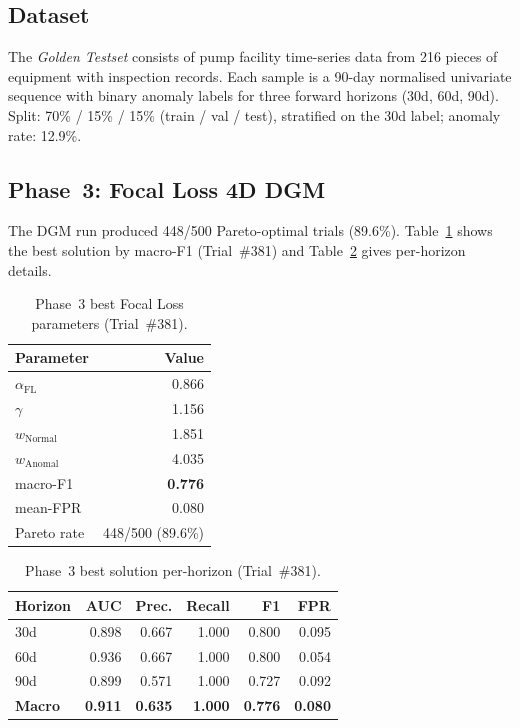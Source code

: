 ﻿\documentclass[twocolumn]{article}
\begin{document}
\subsection{Dataset}

The \emph{Golden Testset} consists of pump facility time-series
data from 216 pieces of equipment with inspection records.
Each sample is a 90-day normalised univariate sequence with
binary anomaly labels for three forward horizons (30d, 60d, 90d).
Split: 70\% / 15\% / 15\% (train / val / test),
stratified on the 30d label; anomaly rate: 12.9\%.

\subsection{Phase~3: Focal Loss 4D DGM}

The DGM run produced 448/500 Pareto-optimal trials (89.6\%).
Table~\ref{tab:v02_best} shows the best solution by macro-F1
(Trial~\#381) and Table~\ref{tab:v02_per_horizon} gives
per-horizon details.

\begin{table}
\centering
\caption{Phase~3 best Focal Loss parameters (Trial~\#381).}
\label{tab:v02_best}
\small
\renewcommand{\arraystretch}{1.05}
\setlength{\tabcolsep}{4pt}
\begin{tabular}{lr}
\toprule
\textbf{Parameter} & \textbf{Value} \\
\midrule
$\alpha_\text{FL}$ & 0.866 \\
$\gamma$ & 1.156 \\
$w_\text{Normal}$ & 1.851 \\
$w_\text{Anomal}$ & 4.035 \\
\midrule
macro-F1 & \textbf{0.776} \\
mean-FPR & 0.080 \\
Pareto rate & 448/500 (89.6\%) \\
\bottomrule
\end{tabular}
\end{table}

\begin{table}
\centering
\caption{Phase~3 best solution per-horizon (Trial~\#381).}
\label{tab:v02_per_horizon}
\small
\renewcommand{\arraystretch}{1.05}
\setlength{\tabcolsep}{4pt}
\begin{tabular}{lrrrrr}
\toprule
Horizon & AUC & Prec. & Recall & F1 & FPR \\
\midrule
30d & 0.898 & 0.667 & 1.000 & 0.800 & 0.095 \\
60d & 0.936 & 0.667 & 1.000 & 0.800 & 0.054 \\
90d & 0.899 & 0.571 & 1.000 & 0.727 & 0.092 \\
\midrule
\textbf{Macro} & \textbf{0.911} & \textbf{0.635} & \textbf{1.000} & \textbf{0.776} & \textbf{0.080} \\
\bottomrule
\end{tabular}
\end{table}
\end{document}
